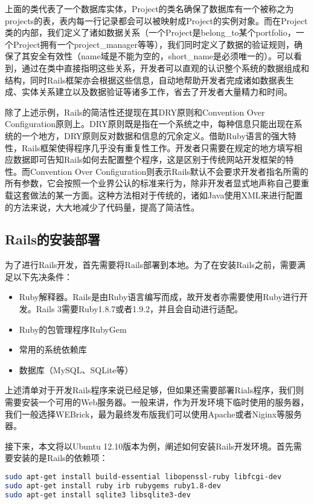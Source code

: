 上面的类代表了一个数据库实体，Project的类名确保了数据库有一个被称之为projects的表，表内每一行记录都会可以被映射成Project的实例对象。而在Project类的内部，我们定义了诸如数据关系（一个Project是belong\_to某个portfolio，一个Project拥有一个project\_manager等等），我们同时定义了数据的验证规则，确保了其安全有效性（name域是不能为空的，short\_name是必须唯一的）。可以看到，通过在类中直接指明这些关系，开发者可以直观的认识整个系统的数据组成和结构，同时Rails框架亦会根据这些信息，自动地帮助开发者完成诸如数据表生成、实体关系建立以及数据验证等诸多工作，省去了开发者大量精力和时间。

除了上述示例，Rails的简洁性还提现在其DRY原则和Convention Over Configuration原则上\supercite{rails-book}。DRY原则既是指在一个系统之中，每种信息只能出现在系统的一个地方，DRY原则反对数据和信息的冗余定义。借助Ruby语言的强大特性，Rails框架使得程序几乎没有重复性工作。开发者只需要在规定的地方填写相应数据即可告知Rails如何去配置整个程序，这是区别于传统网站开发框架的特性。而Convention Over Configuration则表示Rails默认不会要求开发者指名所需的所有参数，它会按照一个业界公认的标准来行为，除非开发者显式地声称自己要重载这套做法的某一方面。这种方法相对于传统的，诸如Java使用XML来进行配置的方法来说，大大地减少了代码量，提高了简洁性。

\subsection{Rails的安装部署}
为了进行Rails开发，首先需要将Rails部署到本地。为了在安装Rails之前，需要满足以下先决条件：
\begin{itemize}
\item Ruby解释器。Rails是由Ruby语言编写而成，故开发者亦需要使用Ruby进行开发。Rails 3需要Ruby1.8.7或者1.9.2，并且会自动进行适配\supercite{rails-book}。
\item Ruby的包管理程序RubyGem
\item 常用的系统依赖库
\item 数据库（MySQL、SQLite等）
\end{itemize}

上述清单对于开发Rails程序来说已经足够，但如果还需要部署Rials程序，我们则需要安装一个可用的Web服务器。一般来讲，作为开发环境下临时使用的服务器，我们一般选择WEBrick，最为最终发布版我们可以使用Apache或者Niginx等服务器。

接下来，本文将以Ubuntu 12.10版本为例，阐述如何安装Rails开发环境。首先需要安装的是Rails的依赖项：

\begin{lstlisting}[caption={安装Rails依赖}, label=rails-dep, language=bash]
sudo apt-get install build-essential libopenssl-ruby libfcgi-dev
sudo apt-get install ruby irb rubygems ruby1.8-dev
sudo apt-get install sqlite3 libsqlite3-dev
\end{lstlisting}

